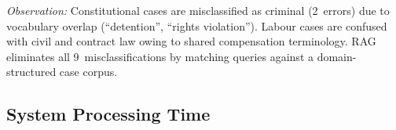 \documentclass[conference]{IEEEtran}
\begin{document}
\begin{table}[ht]
\centering
\caption{Confusion Matrix --- Without RAG / Keyword Baseline (80 Queries)}
\label{tab:cm_nokw}
\renewcommand{\arraystretch}{1.05}
\end{table}

\textit{Observation:} Constitutional cases are misclassified as criminal
(2~errors) due to vocabulary overlap (``detention'', ``rights violation'').
Labour cases are confused with civil and contract law owing to shared
compensation terminology. RAG eliminates all 9~misclassifications by
matching queries against a domain-structured case corpus.

\subsection{System Processing Time}
\end{document}
